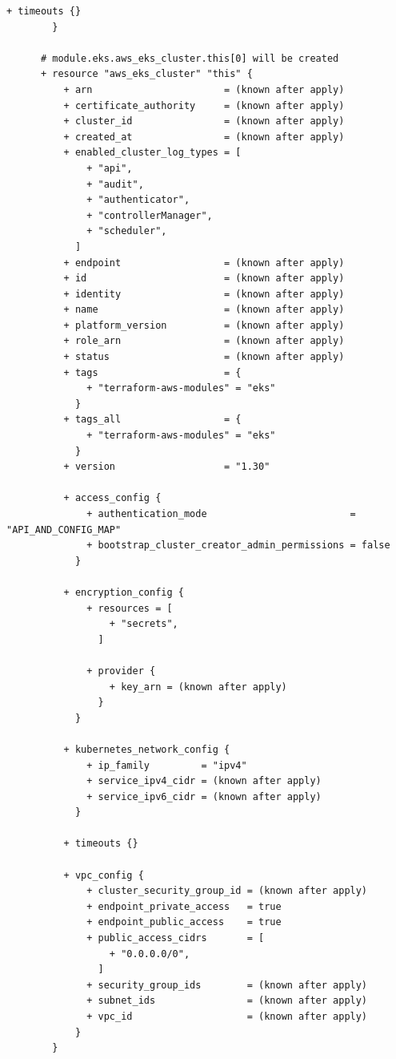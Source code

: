 \begin{lstlisting}[caption={terraform plan output for \texttt{cloudkube} provisioning}, breaklines=true, breakatwhitespace=false]
          + timeouts {}
        }
    
      # module.eks.aws_eks_cluster.this[0] will be created
      + resource "aws_eks_cluster" "this" {
          + arn                       = (known after apply)
          + certificate_authority     = (known after apply)
          + cluster_id                = (known after apply)
          + created_at                = (known after apply)
          + enabled_cluster_log_types = [
              + "api",
              + "audit",
              + "authenticator",
              + "controllerManager",
              + "scheduler",
            ]
          + endpoint                  = (known after apply)
          + id                        = (known after apply)
          + identity                  = (known after apply)
          + name                      = (known after apply)
          + platform_version          = (known after apply)
          + role_arn                  = (known after apply)
          + status                    = (known after apply)
          + tags                      = {
              + "terraform-aws-modules" = "eks"
            }
          + tags_all                  = {
              + "terraform-aws-modules" = "eks"
            }
          + version                   = "1.30"
    
          + access_config {
              + authentication_mode                         = "API_AND_CONFIG_MAP"
              + bootstrap_cluster_creator_admin_permissions = false
            }
    
          + encryption_config {
              + resources = [
                  + "secrets",
                ]
    
              + provider {
                  + key_arn = (known after apply)
                }
            }
    
          + kubernetes_network_config {
              + ip_family         = "ipv4"
              + service_ipv4_cidr = (known after apply)
              + service_ipv6_cidr = (known after apply)
            }
    
          + timeouts {}
    
          + vpc_config {
              + cluster_security_group_id = (known after apply)
              + endpoint_private_access   = true
              + endpoint_public_access    = true
              + public_access_cidrs       = [
                  + "0.0.0.0/0",
                ]
              + security_group_ids        = (known after apply)
              + subnet_ids                = (known after apply)
              + vpc_id                    = (known after apply)
            }
        }
    

\end{lstlisting}
